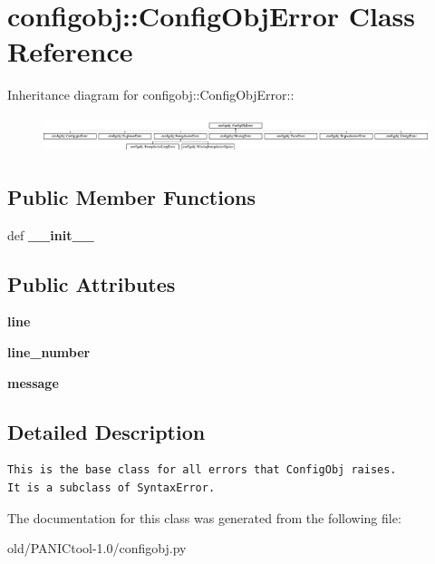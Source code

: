 \section{configobj::Config\-Obj\-Error Class Reference}
\label{classconfigobj_1_1ConfigObjError}
Inheritance diagram for configobj::Config\-Obj\-Error::\begin{figure}[H]
\begin{center}
\leavevmode
\includegraphics[height=1.05727cm]{classconfigobj_1_1ConfigObjError}
\end{center}
\end{figure}
\subsection*{Public Member Functions}
\begin{CompactItemize}
\item 
def \textbf{\_\-\_\-init\_\-\_\-}\label{classconfigobj_1_1ConfigObjError_f5287b5e65a96bff3310a78f79582807}

\end{CompactItemize}
\subsection*{Public Attributes}
\begin{CompactItemize}
\item 
\textbf{line}\label{classconfigobj_1_1ConfigObjError_8f4cc54a73c7b5381515a42531c270af}

\item 
\textbf{line\_\-number}\label{classconfigobj_1_1ConfigObjError_17f84e438edc4fb0805a9c6547569b63}

\item 
\textbf{message}\label{classconfigobj_1_1ConfigObjError_2ccd77b0d14701e8ead308b7a66de43e}

\end{CompactItemize}


\subsection{Detailed Description}


\footnotesize\begin{verbatim}
This is the base class for all errors that ConfigObj raises.
It is a subclass of SyntaxError.
\end{verbatim}
\normalsize
 



The documentation for this class was generated from the following file:\begin{CompactItemize}
\item 
old/PANICtool-1.0/configobj.py\end{CompactItemize}
